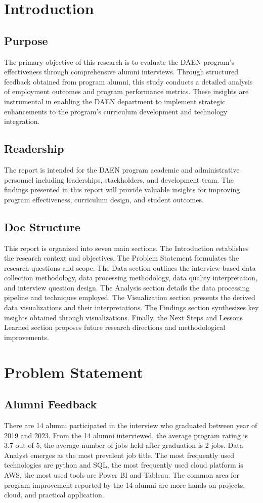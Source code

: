 \documentclass[12pt,a4paper]{article}
\begin{document}
\section{Introduction}
\subsection{Purpose}
The primary objective of this research is to evaluate the DAEN 
program's effectiveness through comprehensive alumni interviews. Through structured feedback 
obtained from program alumni, this study conducts a 
detailed analysis of employment outcomes and program performance 
metrics. These insights are instrumental in enabling the DAEN 
department to implement strategic enhancements to the program's curriculum development and technology integration.

\subsection{Readership}
The report is intended for the DAEN program academic and 
administrative personnel including leaderships, stackholders, 
and development team. The findings presented in this report will provide valuable insights for improving program effectiveness, curriculum design, and student outcomes.

\subsection{Doc Structure}
This report is organized into seven main sections. The Introduction 
establishes the research context and objectives. The Problem 
Statement formulates the research questions and scope. 
The Data section outlines the interview-based data collection 
methodology, data processing methodology, data quality interpretation, and interview question design. The Analysis section details the data 
processing pipeline and techniques employed. The Visualization section presents the derived data visualizations 
and their interpretations. The Findings section synthesizes key 
insights obtained through visualizations. Finally, the Next 
Steps and Lessons Learned section proposes future research 
directions and methodological improvements.

\section{Problem Statement}
\subsection{Alumni Feedback}
There are 14 alumni participated in the interview who graduated between year of 2019 and 2023. From the 14 alumni interviewed, the average program rating is 3.7 out of 5, the average number of jobs held after graduation is 2 jobs. Data Analyst emerges as the most prevalent job title. The most frequently used technologies are python and SQL, the most frequently used cloud platform is AWS, the most used tools are Power BI and Tableau. The common area for program improvement reported by the 14 alumni are more hands-on projects, cloud, and practical application. 
\end{document}
